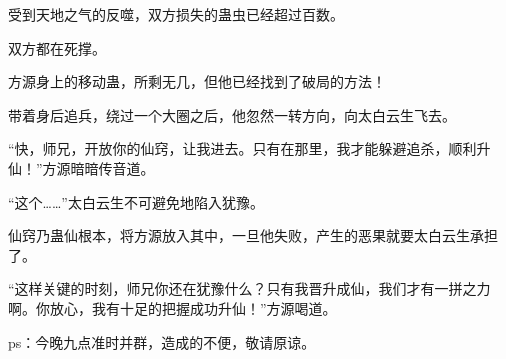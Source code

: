 \begin{this_body}
受到天地之气的反噬，双方损失的蛊虫已经超过百数。

双方都在死撑。

方源身上的移动蛊，所剩无几，但他已经找到了破局的方法！

带着身后追兵，绕过一个大圈之后，他忽然一转方向，向太白云生飞去。

“快，师兄，开放你的仙窍，让我进去。只有在那里，我才能躲避追杀，顺利升仙！”方源暗暗传音道。

“这个……”太白云生不可避免地陷入犹豫。

仙窍乃蛊仙根本，将方源放入其中，一旦他失败，产生的恶果就要太白云生承担了。

“这样关键的时刻，师兄你还在犹豫什么？只有我晋升成仙，我们才有一拼之力啊。你放心，我有十足的把握成功升仙！”方源喝道。

ps：今晚九点准时并群，造成的不便，敬请原谅。

\end{this_body}

